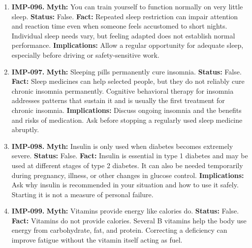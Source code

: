 \documentclass[11pt,oneside]{book}
\begin{document}
\begin{enumerate}[leftmargin=0pt,labelwidth=0pt,labelsep=0pt,itemindent=0pt]
\textbf{Implications:} Persistent daytime sleepiness, loud snoring, or repeated waking merits assessment rather than being dismissed as age-related.
\item[] \textbf{IMP-096.} \textbf{Myth:} You can train yourself to function normally on very little sleep.\newline
\textbf{Status:} False.\newline
\textbf{Fact:} Repeated sleep restriction can impair attention and reaction time even when someone feels accustomed to short nights. Individual sleep needs vary, but feeling adapted does not establish normal performance. \cite{ref432}\newline
\textbf{Implications:} Allow a regular opportunity for adequate sleep, especially before driving or safety-sensitive work.
\item[] \textbf{IMP-097.} \textbf{Myth:} Sleeping pills permanently cure insomnia.\newline
\textbf{Status:} False.\newline
\textbf{Fact:} Sleep medicines can help selected people, but they do not reliably cure chronic insomnia permanently. Cognitive behavioral therapy for insomnia addresses patterns that sustain it and is usually the first treatment for chronic insomnia. \cite{ref433}\newline
\textbf{Implications:} Discuss ongoing insomnia and the benefits and risks of medication. Ask before stopping a regularly used sleep medicine abruptly.
\item[] \textbf{IMP-098.} \textbf{Myth:} Insulin is only used when diabetes becomes extremely severe.\newline
\textbf{Status:} False.\newline
\textbf{Fact:} Insulin is essential in type 1 diabetes and may be used at different stages of type 2 diabetes. It can also be needed temporarily during pregnancy, illness, or other changes in glucose control. \cite{ref260,ref271}\newline
\textbf{Implications:} Ask why insulin is recommended in your situation and how to use it safely. Starting it is not a measure of personal failure.
\item[] \textbf{IMP-099.} \textbf{Myth:} Vitamins provide energy like calories do.\newline
\textbf{Status:} False.\newline
\textbf{Fact:} Vitamins do not provide calories. Several B vitamins help the body use energy from carbohydrate, fat, and protein. Correcting a deficiency can improve fatigue without the vitamin itself acting as fuel. \cite{ref434}\newline

\end{enumerate}
\end{document}
